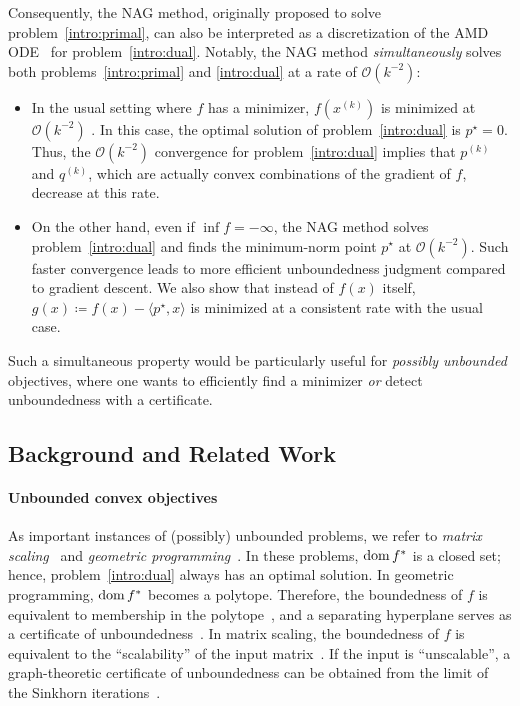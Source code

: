 \documentclass[11pt,a4paper]{article}
\theoremstyle{definition}
\theoremstyle{plain}
\newcommand{\dom}{\mathop{\rm dom}}
\begin{document}
Consequently, the NAG method, originally proposed to solve problem~\eqref{intro:primal}, can also be interpreted as a discretization of the AMD ODE~\cite{KBB2015} for problem~\eqref{intro:dual}.
Notably, the NAG method \textit{simultaneously} solves both problems~\eqref{intro:primal} and \eqref{intro:dual} at a rate of $\mathcal{O}(k^{-2})$:
\begin{itemize}
    \item In the usual setting where $f$ has a minimizer, $f(x^{(k)})$ is minimized at $\mathcal{O}(k^{-2})$ \cite{Nesterov1983}.
    In this case, the optimal solution of problem~\eqref{intro:dual} is $p^\star = 0$.
    Thus, the $\mathcal{O}(k^{-2})$ convergence for problem~\eqref{intro:dual} implies that $p^{(k)}$ and $q^{(k)}$, which are actually convex combinations of the gradient of $f$, decrease at this rate.
    \item On the other hand, even if $\inf f = -\infty$, the NAG method solves problem~\eqref{intro:dual} and finds the minimum-norm point $p^\star$ at $\mathcal{O}(k^{-2})$.
    Such faster convergence leads to more efficient unboundedness judgment compared to gradient descent.
    We also show that instead of $f(x)$ itself, $g(x) \coloneqq f(x) - \langle p^\star, x\rangle$ is minimized at a consistent rate with the usual case.
\end{itemize}
Such a simultaneous property would be particularly useful for \textit{possibly unbounded} objectives, where one wants to efficiently find a minimizer \textit{or} detect unboundedness with a certificate.

\subsection{Background and Related Work}\label{subsec:related}
\paragraph{Unbounded convex objectives}
As important instances of (possibly) unbounded problems, we refer to \textit{matrix scaling}~\cite{HHS2024,Idel2016,RS1989,Sinkhorn1964} and \textit{geometric programming}~\cite{BKVH2007,BLNW2020}.
In these problems, $\dom f^\ast$ is a closed set; hence, problem~\eqref{intro:dual} always has an optimal solution.
In geometric programming, $\dom f^\ast$ becomes a polytope.
Therefore, the boundedness of $f$ is equivalent to membership in the polytope~\cite{BLNW2020}, and a separating hyperplane serves as a certificate of unboundedness~\cite{HHS2024}.
In matrix scaling, the boundedness of $f$ is equivalent to the ``scalability'' of the input matrix~\cite{RS1989}.
If the input is ``unscalable'', a graph-theoretic certificate of unboundedness can be obtained from the limit of the Sinkhorn iterations~\cite{HHS2024}.
\end{document}
